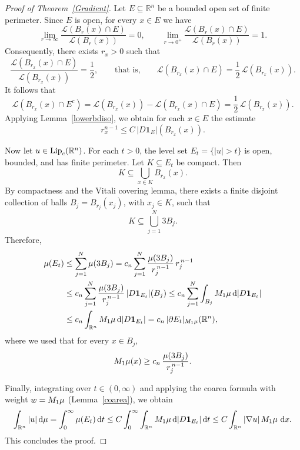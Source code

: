 \documentclass[10pt,a4paper]{amsart}
\DeclareMathOperator{\Lip}{\textup{Lip}}
\newcommand{\R}{\mathbb R}
\newcommand{\dx}{\,{\mathrm dx}}
\begin{document}
\begin{proof}[Proof of Theorem~\ref{Gradient}]
Let $E\subseteq \R^n$ be a bounded open set of finite perimeter. Since $E$ is open, for every $x\in E$ we have
\[
\lim_{r\to\infty}\frac{\mathcal L(B_r(x)\cap E)}{\mathcal L(B_r(x))}=0,
\qquad
\lim_{r\to 0^+}\frac{\mathcal L(B_r(x)\cap E)}{\mathcal L(B_r(x))}=1.
\]
Consequently, there exists $r_x>0$ such that
\[
\frac{\mathcal L(B_{r_x}(x)\cap E)}{\mathcal L(B_{r_x}(x))}=\frac12,
\qquad\text{that is,}\qquad
\mathcal L(B_{r_x}(x)\cap E)=\frac12\,\mathcal L(B_{r_x}(x)).
\]
It follows that
\[
\mathcal L(B_{r_x}(x)\cap E^c)
=\mathcal L(B_{r_x}(x))-\mathcal L(B_{r_x}(x)\cap E)
=\frac12\,\mathcal L(B_{r_x}(x)).
\]
Applying Lemma~\ref{lowerbdiso}, we obtain for each $x\in E$ the estimate
\[
r_x^{n-1}\le C\,|D\mathbf 1_E|(B_{r_x}(x)).
\]

Now let $u\in \Lip_c(\R^n)$. For each $t>0$, the level set $E_t=\{|u|>t\}$ is open, bounded, and has finite perimeter. Let $K\subseteq E_t$ be compact. Then
\[
K\subseteq \bigcup_{x\in K} B_{r_x}(x).
\]
By compactness and the Vitali covering lemma, there exists a finite disjoint collection of balls $B_j=B_{r_j}(x_j)$, with $x_j\in K$, such that
\[
K\subseteq \bigcup_{j=1}^N 3B_j.
\]
Therefore,
\begin{align*}
\mu(E_t)
&\le \sum_{j=1}^N \mu(3B_j)
= c_n\sum_{j=1}^N \frac{\mu(3B_j)}{r_j^{\,n-1}}\, r_j^{\,n-1} \\
&\le c_n\sum_{j=1}^N \frac{\mu(3B_j)}{r_j^{\,n-1}}\,
|D\mathbf 1_{E_t}|(B_j)
\le c_n\sum_{j=1}^N \int_{B_j} \textup{M}_1\mu\,\mathrm d|D\mathbf 1_{E_t}| \\
&\le c_n\int_{\R^n} \textup{M}_1\mu\,\mathrm d|D\mathbf 1_{E_t}|
= c_n\,|\partial E_t|_{\textup{M}_1\mu}(\R^n),
\end{align*}
where we used that for every $x\in B_j$,
\[
\textup{M}_1\mu(x)\ge c_n\,\frac{\mu(3B_j)}{r_j^{\,n-1}}.
\]

Finally, integrating over $t\in(0,\infty)$ and applying the coarea formula with weight $w=\textup{M}_1\mu$ (Lemma~\eqref{coarea}), we obtain
\[
\int_{\R^n} |u|\,\mathrm d\mu
= \int_0^\infty \mu(E_t)\,\mathrm dt
\le C\int_0^\infty \int_{\R^n} \textup{M}_1\mu\,\mathrm d|D\mathbf 1_{E_t}|\,\mathrm dt
\le C\int_{\R^n} |\nabla u|\,\textup{M}_1\mu\,\dx.
\]
This concludes the proof.
\end{proof}
\end{document}
